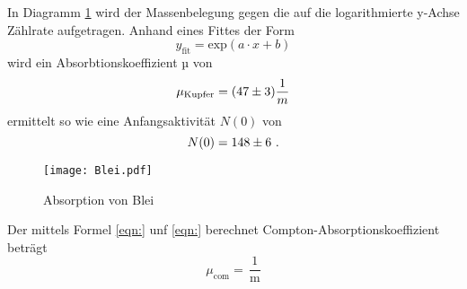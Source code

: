 In Diagramm \ref{fig:Blei} wird der Massenbelegung gegen die auf die logarithmierte y-Achse Zählrate aufgetragen. Anhand eines Fittes der Form 
\begin{equation}
  y_\text{fit} = \text{exp}(a \cdot x + b) 
  \label{eqn:fit}
\end{equation} 
wird ein Absorbtionskoeffizient µ von 
\begin{equation}
  \mu_\text{Kupfer} = (\num{47 +- 3}) \frac{1}{m}
  \label{eqn:absK}
\end{equation}
ermittelt so wie eine Anfangsaktivität $N(0)$ von 
\begin{equation}
  N(0) = \num{148 +- 6} \ .
  \label{eqn:NBlei}
\end{equation}
\begin{figure}
  \centering
  \texttt{[image: Blei.pdf]}
  \caption{Absorption von Blei}
  \label{fig:Blei}
\end{figure}
Der mittels Formel \ref{eqn:} unf \ref{eqn:} berechnet Compton-Absorptionskoeffizient beträgt
\begin{equation}
  \mu_\text{com} =  \, \frac{1}{\text{m}}
  \label{eqn:}
\end{equation}


